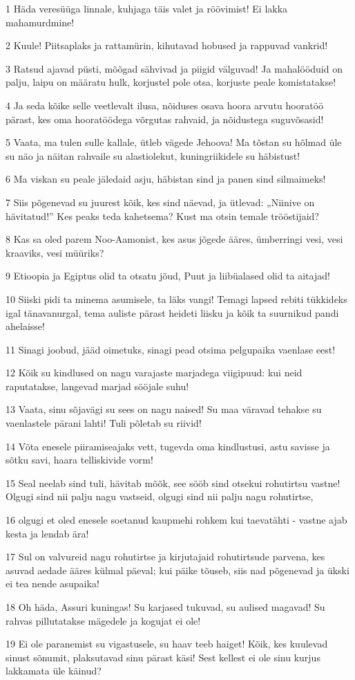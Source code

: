 \par 1 Häda veresüüga linnale, kuhjaga täis valet ja röövimist! Ei lakka mahamurdmine!
\par 2 Kuule! Piitsaplaks ja rattamürin, kihutavad hobused ja rappuvad vankrid!
\par 3 Ratsud ajavad püsti, mõõgad sähvivad ja piigid välguvad! Ja mahalööduid on palju, laipu on määratu hulk, korjustel pole otsa, korjuste peale komistatakse!
\par 4 Ja seda kõike selle veetlevalt ilusa, nõiduses osava hoora arvutu hooratöö pärast, kes oma hooratöödega võrgutas rahvaid, ja nõidustega suguvõsasid!
\par 5 Vaata, ma tulen sulle kallale, ütleb vägede Jehoova! Ma tõstan su hõlmad üle su näo ja näitan rahvaile su alastiolekut, kuningriikidele su häbistust!
\par 6 Ma viskan su peale jäledaid asju, häbistan sind ja panen sind silmaimeks!
\par 7 Siis põgenevad su juurest kõik, kes sind näevad, ja ütlevad: „Niinive on hävitatud!” Kes peaks teda kahetsema? Kust ma otsin temale trööstijaid?
\par 8 Kas sa oled parem Noo-Aamonist, kes asus jõgede ääres, ümberringi vesi, vesi kraaviks, vesi müüriks?
\par 9 Etioopia ja Egiptus olid ta otsatu jõud, Puut ja liibüalased olid ta aitajad!
\par 10 Siiski pidi ta minema asumisele, ta läks vangi! Temagi lapsed rebiti tükkideks igal tänavanurgal, tema auliste pärast heideti liisku ja kõik ta suurnikud pandi ahelaisse!
\par 11 Sinagi joobud, jääd oimetuks, sinagi pead otsima pelgupaika vaenlase eest!
\par 12 Kõik su kindlused on nagu varajaste marjadega viigipuud: kui neid raputatakse, langevad marjad sööjale suhu!
\par 13 Vaata, sinu sõjavägi su sees on nagu naised! Su maa väravad tehakse su vaenlastele pärani lahti! Tuli põletab su riivid!
\par 14 Võta enesele piiramiseajaks vett, tugevda oma kindlustusi, astu savisse ja sõtku savi, haara telliskivide vorm!
\par 15 Seal neelab sind tuli, hävitab mõõk, see sööb sind otsekui rohutirtsu vastne! Olgugi sind nii palju nagu vastseid, olgugi sind nii palju nagu rohutirtse,
\par 16 olgugi et oled enesele soetanud kaupmehi rohkem kui taevatähti - vastne ajab kesta ja lendab ära!
\par 17 Sul on valvureid nagu rohutirtse ja kirjutajaid rohutirtsude parvena, kes asuvad aedade ääres külmal päeval; kui päike tõuseb, siis nad põgenevad ja ükski ei tea nende asupaika!
\par 18 Oh häda, Assuri kuningas! Su karjased tukuvad, su aulised magavad! Su rahvas pillutatakse mägedele ja kogujat ei ole!
\par 19 Ei ole paranemist su vigastusele, su haav teeb haiget! Kõik, kes kuulevad sinust sõnumit, plaksutavad sinu pärast käsi! Sest kellest ei ole sinu kurjus lakkamata üle käinud?





